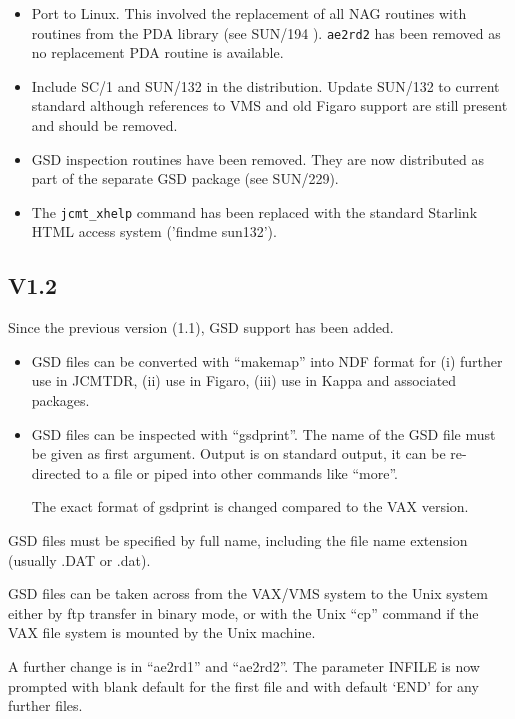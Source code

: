 \documentclass[twoside,11pt]{article}
\newcommand{\xref}[3]{#1}
\renewcommand{\_}{\texttt{\symbol{95}}}
\begin{document}
\begin{itemize}
\item Port to Linux. This involved the replacement of all NAG routines with
  routines from the PDA library (see \xref{SUN/194}{sun194}{} \cite{pda}). \texttt{ae2rd2} has been removed
  as no replacement PDA routine is available.
\item Include SC/1 and SUN/132 in the distribution. Update SUN/132 to current
  standard although references to VMS and old Figaro support are still present
and should be removed.
\item GSD inspection routines have been removed. They are now distributed as
  part of the separate GSD package (see SUN/229).
\item The \texttt{jcmt_xhelp} command has been replaced with the standard
  Starlink HTML access system ('findme sun132').

\end{itemize}

\subsection*{V1.2}

Since the previous version (1.1), GSD support has been added.
\begin{itemize}
\item GSD files can be converted with ``makemap'' into NDF format for (i)
    further use in JCMTDR, (ii) use in Figaro, (iii) use in Kappa and
    associated packages.

\item GSD files can be inspected with ``gsd\_print''. The name of the GSD
    file must be given as first argument. Output is on standard output,
    it can be re-directed to a file or piped into other commands like
    ``more''.

    The exact format of gsd\_print is changed compared to the VAX
    version.
\end{itemize}

 GSD files must be specified by full name, including the file name
 extension (usually .DAT or .dat).

 GSD files can be taken across from the VAX/VMS system to the Unix
 system either by ftp transfer in binary mode, or with the Unix ``cp''
 command if the VAX file system is mounted by the Unix machine.

 A further change is in ``ae2rd1'' and ``ae2rd2''. The parameter INFILE is
 now prompted with blank default for the first file and with default
 `END' for any further files.
\end{document}
